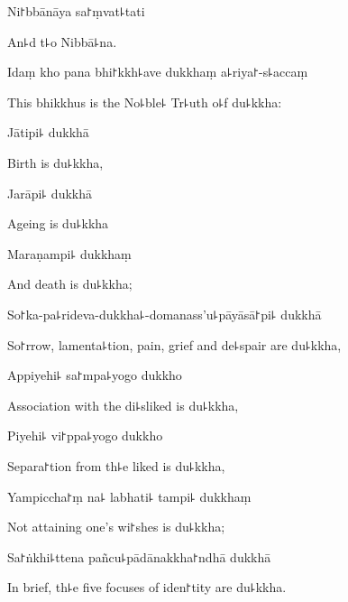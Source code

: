 Ni꜓bbānāya sa꜓ṃvat꜕tati

\begin{english}
  An꜕d t꜕o Nibbā꜕na.
\end{english}

Idaṃ kho pana bhi꜓kkh꜕ave dukkhaṃ a꜕riya꜓-s꜕accaṃ

\begin{english}
  This bhikkhus is the No꜕ble꜕ Tr꜕uth o꜕f du꜕kkha:
\end{english}

Jātipi꜕ dukkhā

\begin{english}
  Birth is du꜕kkha,
\end{english}

Jarāpi꜕ dukkhā

\begin{english}
  Ageing is du꜕kkha
\end{english}

Maraṇampi꜕ dukkhaṃ

\begin{english}
  And death is du꜕kkha;
\end{english}

So꜓ka-pa꜕rideva-dukkha꜕-domanass'u꜕pāyāsā꜓pi꜕ dukkhā

\begin{english}
  So꜓rrow, lamenta꜕tion, pain, grief and de꜕spair are du꜕kkha,
\end{english}

Appiyehi꜕ sa꜓mpa꜕yogo dukkho

\begin{english}
  Association with the di꜕sliked is du꜕kkha,
\end{english}

\ifaivedition
\clearpage
\fi

Piyehi꜕ vi꜓ppa꜕yogo dukkho

\begin{english}
  Separa꜓tion from th꜕e liked is du꜕kkha,
\end{english}

Yampiccha꜓ṃ na꜕ labhati꜕ tampi꜕ dukkhaṃ

\begin{english}
  Not attaining one's wi꜓shes is du꜕kkha;
\end{english}

Sa꜓ṅkhi꜕ttena pañcu꜕pādānakkha꜓ndhā dukkhā

\begin{english}
  In brief, th꜕e five focuses of iden꜓tity are du꜕kkha.
\end{english}

